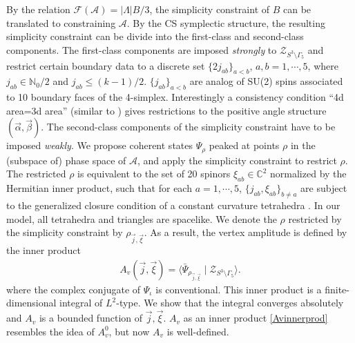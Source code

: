 \documentclass[aps,prd,notitlepage,nofootinbib,superscriptaddress,groupedaddress,twocolumn]{revtex4-1}
\def\C{\mathbb{C}}
\def\be{\begin{eqnarray}}
\def\ee{\end{eqnarray}}
\newcommand{\ca}{\mathcal A}
\newcommand{\cf}{\mathcal F}
\newcommand{\cz}{\mathcal Z}
\renewcommand{\a}{\alpha}
\renewcommand{\b}{\beta}
\newcommand{\G}{\Gamma}
\renewcommand{\L }{\Lambda}
\begin{document}
By the relation $\cf (\ca)=|\L| B/3$, the simplicity constraint of $B$ can be translated to constraining $\ca$. By the CS symplectic structure, the resulting simplicity constraint can be divide into the first-class and second-class components. The first-class components are imposed \emph{strongly} to $\cz_{S^3\setminus\G_5}$ and restrict certain boundary data to a discrete set $\{2j_{ab}\}_{a<b}$, $a,b=1,\cdots,5$, where $j_{ab}\in \mathbb{N}_0/2$ and $j_{ab}\leq (k-1)/2$. $\{j_{ab}\}_{a<b}$ are analog of SU(2) spins associated to 10 boundary faces of the 4-simplex. Interestingly a consistency condition ``4d area=3d area'' (similar to \cite{generalize}) gives restrictions to the positive angle structure $(\vec{\a},\vec{\b})$. The second-class components of the simplicity constraint have to be imposed \emph{weakly}. We propose coherent states $\Psi_\rho$ peaked at points $\rho$ in the (subspace of) phase space of $\ca$, and apply the simplicity constraint to restrict $\rho$. The restricted $\rho$ is equivalent to the set of 20 spinors $\xi_{ab}\in \C^2$ normalized by the Hermitian inner product, such that for each $a=1,\cdots,5$, $\{{j}_{ab},{\xi}_{ab}\}_{b\neq a}$ are subject to the generalized closure condition of a constant curvature tetrahedra \cite{curvedMink}. In our model, all tetrahedra and triangles are spacelike. We denote the $\rho$ restricted by the simplicity constraint by $\rho_{\vec{j},\vec{\xi}}$. As a result, the vertex amplitude is defined by the inner product
\be
A_v(\vec{j},\vec{\xi})=\langle\bar{\Psi}_{\rho_{\vec{j},\vec{\xi}}}\mid \cz_{S^3\setminus\G_5}\rangle.\label{Avinnerprod}
\ee
where the complex conjugate of $\Psi_\iota$ is conventional. This inner product is a finite-dimensional integral of $L^2$-type. We show that the integral converges absolutely and $A_v$ is a bounded function of $\vec{j},\vec{\xi}$. $A_v$ as an inner product \eqref{Avinnerprod} resembles the idea of $A^0_v$, but now $A_v$ is well-defined. 


\end{document}
